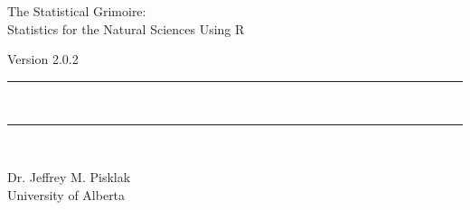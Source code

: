 {}
{
\Huge\centering\headingfont The Statistical Grimoire: \\
Statistics for the Natural Sciences Using R\\

\vspace{0.5em}

\small\mdseries\raggedright Version 2.0.2

\rule{\linewidth}{1pt}\\[-6mm]
\rule{\linewidth}{2pt}\\

}

\vskip 2cm

\begin{center}
\Large Dr. Jeffrey M. Pisklak \\
\vspace{0.5em}
\large University of Alberta
\end{center}

\vfill

